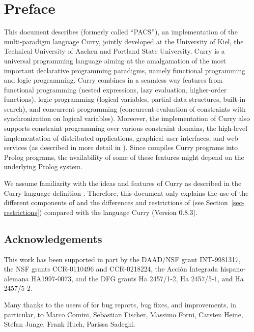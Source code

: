 \section*{Preface}

This document describes \CYS (formerly called ``PACS''),
an implementation of the multi-paradigm language Curry,
jointly developed at the University of Kiel, the Technical University
of Aachen and Portland State University.
Curry is a universal programming language aiming at the amalgamation
of the most important declarative programming paradigms,
namely functional programming and logic programming.  
Curry combines in a seamless way features from functional programming
(nested expressions, lazy evaluation, higher-order functions),
logic programming (logical variables, partial data structures,
built-in search), and concurrent programming (concurrent evaluation
of constraints with synchronization on logical variables).
Moreover, the \CYS implementation of Curry also supports
constraint programming over various constraint domains,
the high-level implementation of distributed applications,
graphical user interfaces, and web services
(as described in more detail in \cite{Hanus99PPDP,Hanus00PADL,Hanus01PADL}).
Since \CYS compiles Curry programs into Prolog programs,
the availability of some of these features might depend on
the underlying Prolog system.

We assume familiarity with the ideas and features
of Curry as described in the Curry language definition \cite{Hanus12Curry}.
Therefore, this document only explains the use of the different
components of \CYS
and the differences and restrictions of \CYS
(see Section~\ref{sec-restrictions})
compared with the language Curry (Version 0.8.3).


\bigskip

\subsection*{Acknowledgements}

This work has been supported in part by the DAAD/NSF grant INT-9981317,
the NSF grants CCR-0110496 and CCR-0218224,
the Acci\'on Integrada hispano-alemana HA1997-0073,
and the DFG grants Ha 2457/1-2, Ha 2457/5-1, and Ha 2457/5-2.

Many thanks to the users of \CYS for bug reports, bug fixes, and improvements,
in particular, to Marco Comini, Sebastian Fischer, Massimo Forni,
Carsten Heine, Stefan Junge, Frank Huch, Parissa Sadeghi.


